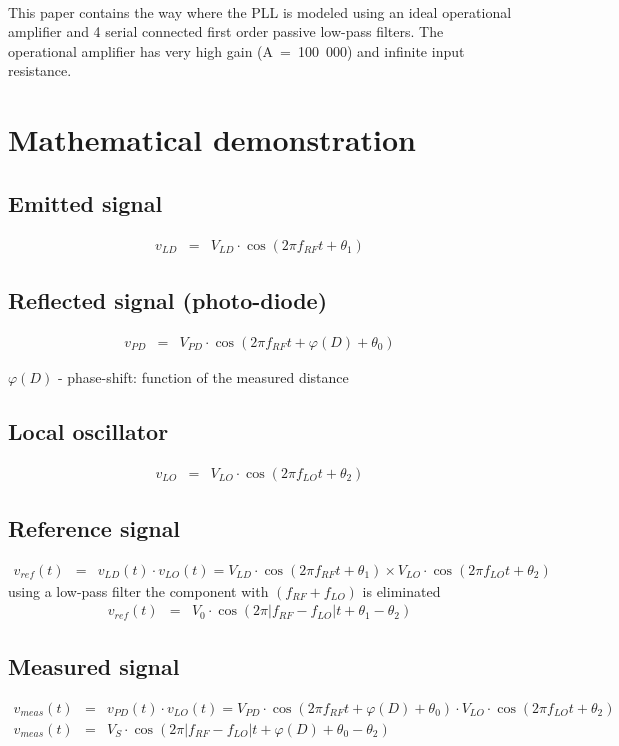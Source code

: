 \documentclass[fleqn]{article}
\begin{document}
~

This paper contains the way where the PLL is modeled using an ideal operational amplifier and 4 serial connected first order passive low-pass filters. The operational amplifier has very high gain (A = 100 000) and infinite input resistance.

\newpage
\section{Mathematical demonstration}
\subsection{Emitted signal}
\begin{eqnarray}
v_{LD} &=& V_{LD} \cdot \cos\left(2\pi f_{RF}t+\theta_1\right) \nonumber
\end{eqnarray}
\subsection{Reflected signal (photo-diode)}
\begin{eqnarray}
v_{PD} &=& V_{PD} \cdot \cos\left(2\pi f_{RF}t+\varphi(D)+\theta_0\right) \nonumber
\end{eqnarray}

$\varphi(D)$ - phase-shift: function of the measured distance

\subsection{Local oscillator}
\begin{eqnarray}
v_{LO} &=& V_{LO} \cdot \cos\left(2\pi f_{LO}t+\theta_2\right) \nonumber
\end{eqnarray}
\subsection{Reference signal}
\begin{eqnarray}
v_{ref}(t) &=& v_{LD}(t)\cdot v_{LO}(t) = V_{LD}\cdot\cos\left(2\pi f_{RF}t + \theta_1\right)\times V_{LO}\cdot\cos\left(2\pi f_{LO}t + \theta_2\right) \nonumber
\end{eqnarray}
using a low-pass filter the component with $\left(f_{RF}+f_{LO}\right)$ is eliminated
\begin{eqnarray}
v_{ref}(t) &=& V_0\cdot\cos\left(2\pi|f_{RF}-f_{LO}|t+\theta_1-\theta_2\right) \nonumber
\end{eqnarray}
\subsection{Measured signal}
\begin{eqnarray}
v_{meas}(t)&=&v_{PD}(t)\cdot v_{LO}(t) =V_{PD} \cdot \cos\left(2\pi f_{RF}t+\varphi(D)+\theta_0\right)\cdot V_{LO} \cdot \cos\left(2\pi f_{LO}t+\theta_2\right) \nonumber \\
v_{meas}(t)&=&V_S\cdot\cos\left(2\pi|f_{RF}-f_{LO}|t+\varphi(D)+\theta_0-\theta_2\right) \nonumber
\end{eqnarray}
\end{document}
